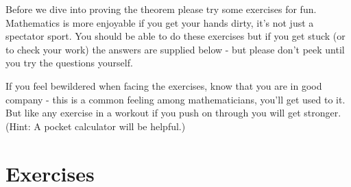 \documentclass{article}
\begin{document}
Before we dive into proving the theorem please try some exercises for fun.
Mathematics is more enjoyable if you get your hands dirty, it's not
just a spectator sport.
You should be able to do these exercises but if you get stuck (or to
check your work) the
answers are supplied below - but please don't peek until you try the questions yourself.

If you feel bewildered when facing the exercises, know that you are in good
company - this is a common feeling among mathematicians, you'll get used to it.
But like any exercise in a workout if you push on through you will get stronger.
(Hint: A pocket calculator will be helpful.)

\break
\section*{Exercises}
\end{document}

